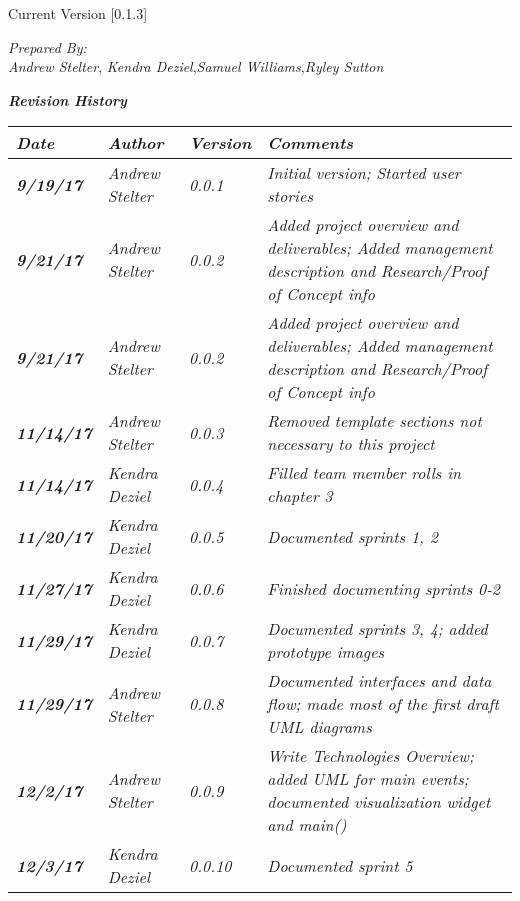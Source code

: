 


Current Version [0.1.3]
\vspace*{5mm}

{\color{SDColor5}
\noindent
\textit{Prepared By:}\\
\textit{Andrew Stelter}, \textit{Kendra Deziel},\textit{Samuel Williams},\textit{Ryley Sutton}
}

\vfill
\noindent
{\color{SDColor3} \textit{\textbf{Revision History}}}\\
\begin{tabular}{|>{\raggedright}p{1.5cm}|>{\raggedright}p{3cm}|>{\raggedright}p{1.5cm}|>{\raggedright}p{9cm}|}
\hline
\textit{\textbf{Date}} &  \textit{\textbf{Author}} & \textit{\textbf{Version}} & \textit{\textbf{Comments}}\tabularnewline
\hline
 \textit{\textbf{9/19/17}} & \textit{Andrew Stelter} & \textit{0.0.1} & \textit{Initial version; Started user stories}\tabularnewline
\hline
\textit{\textbf{9/21/17}} & \textit{Andrew Stelter} & \textit{0.0.2} & \textit{Added project overview and deliverables; Added management description and Research/Proof of Concept info }\tabularnewline
\hline
\textit{\textbf{9/21/17}} & \textit{Andrew Stelter} & \textit{0.0.2} & \textit{Added project overview and deliverables; Added management description and Research/Proof of Concept info }\tabularnewline
\hline
\textit{\textbf{11/14/17}} & \textit{Andrew Stelter} & \textit{0.0.3} & \textit{Removed template sections not necessary to this project}\tabularnewline
\hline
\textit{\textbf{11/14/17}} & \textit{Kendra Deziel} & \textit{0.0.4} & \textit{Filled team member rolls in chapter 3}\tabularnewline
\hline
\textit{\textbf{11/20/17}} & \textit{Kendra Deziel} & \textit{0.0.5} & \textit{Documented sprints 1, 2}\tabularnewline
\hline
\textit{\textbf{11/27/17}} & \textit{Kendra Deziel} & \textit{0.0.6} & \textit{Finished documenting sprints 0-2}\tabularnewline
\hline
\textit{\textbf{11/29/17}} & \textit{Kendra Deziel} & \textit{0.0.7} & \textit{Documented sprints 3, 4; added prototype images}\tabularnewline
\hline
\textit{\textbf{11/29/17}} & \textit{Andrew Stelter} & \textit{0.0.8} & \textit{Documented interfaces and data flow; made most of the first draft UML diagrams}\tabularnewline
\hline
\textit{\textbf{12/2/17}} & \textit{Andrew Stelter} & \textit{0.0.9} & \textit{Write Technologies Overview; added UML for main events; documented visualization widget and main()}\tabularnewline
\hline
\textit{\textbf{12/3/17}} & \textit{Kendra Deziel} & \textit{0.0.10} & \textit{Documented sprint 5}\tabularnewline

\end{tabular}
